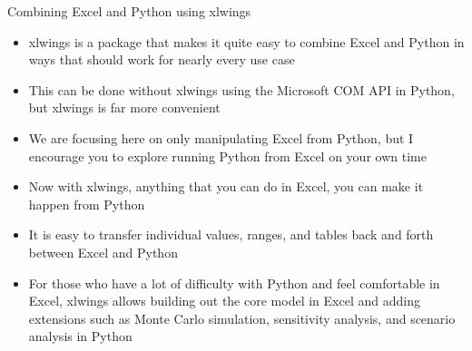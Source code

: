 \documentclass[]{article}
\begin{document}
\begin{section}{Combining Excel and Python using xlwings}
\begin{itemize}
\item xlwings is a package that makes it quite easy to combine Excel and Python in ways that should work for nearly every use case
\item This can be done without xlwings using the Microsoft COM API in Python, but xlwings is far more convenient
\item We are focusing here on only manipulating Excel from Python, but I encourage you to explore running Python from Excel on your own time
\item Now with xlwings, anything that you can do in Excel, you can make it happen from Python
\item It is easy to transfer individual values, ranges, and tables back and forth between Excel and Python
\item For those who have a lot of difficulty with Python and feel comfortable in Excel, xlwings allows building out the core model in Excel and adding extensions such as Monte Carlo simulation, sensitivity analysis, and scenario analysis in Python
\end{itemize}
\end{section}
\end{document}
